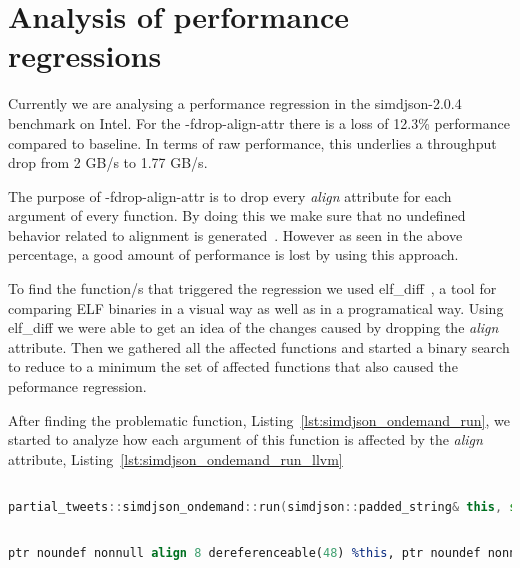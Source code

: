 \section{Analysis of performance regressions}

Currently we are analysing a performance regression in the simdjson-2.0.4
benchmark on Intel. For the -fdrop-align-attr there is a loss of 12.3\%
performance compared to baseline. In terms of raw performance, this underlies a
throughput drop from 2 GB/s to 1.77 GB/s. 

The purpose of -fdrop-align-attr is to drop every \textit{align} attribute for
each argument of every function. By doing this we make sure that no undefined
behavior related to alignment is generated~\cite{align-semantics}. However as
seen in the above percentage, a good amount of performance is lost by using this
approach.

To find the function/s that triggered the regression we used
elf_diff~\cite{elfdiff}, a tool for comparing ELF binaries in a visual way as
well as in a programatical way. Using elf_diff we were able to get an idea of
the changes caused by dropping the \textit{align} attribute. Then we gathered
all the affected functions and started a binary search to reduce to a minimum
the set of affected functions that also caused the peformance regression.

After finding the problematic function, Listing~\ref{lst:simdjson_ondemand_run},
we started to analyze how each argument of this function is affected by the
\textit{align} attribute, Listing~\ref{lst:simdjson_ondemand_run_llvm}

\begin{lstlisting}[language=C++, style=Cstyle, caption={Function that caused
performance regressions}, label={lst:simdjson_ondemand_run}]

partial_tweets::simdjson_ondemand::run(simdjson::padded_string& this, std::vector<partial_tweets::tweet<std::basic_string_view<char, std::char_traits<char> > > json, std::allocator<partial_tweets::tweet<std::basic_string_view<char, std::char_traits<char> > > > >& result)

\end{lstlisting}


\begin{lstlisting}[language=llvm, style=Cstyle, caption={LLVM representation of
arguments of partial_tweets::simdjson_ondemand::run}, label={lst:simdjson_ondemand_run_llvm}]

ptr noundef nonnull align 8 dereferenceable(48) %this, ptr noundef nonnull align 8 dereferenceable(16) %json, ptr noundef nonnull align 8 dereferenceable(24) %result

\end{lstlisting}

